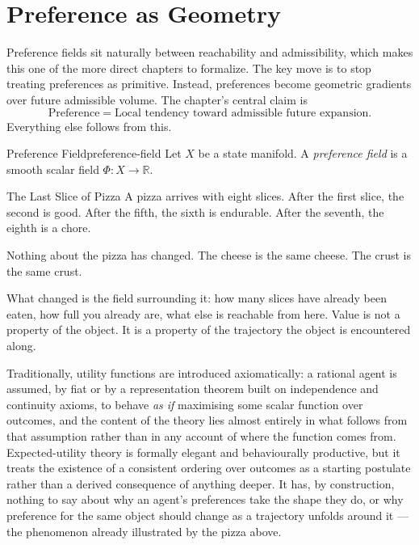 \documentclass[12pt,twoside,openright]{book}
\begin{document}
\section{Preference as Geometry}
\label{sec:ch22-geometry}

Preference fields sit naturally between reachability and
admissibility, which makes this one of the more direct
chapters to formalize. The key move is to stop treating
preferences as primitive. Instead, preferences become
geometric gradients over future admissible volume. The
chapter's central claim is
\[
  \text{Preference} =
  \text{Local tendency toward admissible future expansion}.
\]
Everything else follows from this.

\begin{definition}{Preference Field}{preference-field}
  Let $X$ be a state manifold. A \emph{preference field} is
  a smooth scalar field $\Phi : X \to \mathbb{R}$.
\end{definition}

\begin{distinctionaside}{The Last Slice of Pizza}
A pizza arrives with eight slices. After the first slice, the
second is good. After the fifth, the sixth is endurable.
After the seventh, the eighth is a chore.

Nothing about the pizza has changed. The cheese is the same
cheese. The crust is the same crust.

What changed is the field surrounding it: how many slices
have already been eaten, how full you already are, what else
is reachable from here. Value is not a property of the
object. It is a property of the trajectory the object is
encountered along.
\end{distinctionaside}

Traditionally, utility functions are introduced
axiomatically: a rational agent is assumed, by fiat or by a
representation theorem built on independence and continuity
axioms, to behave \emph{as if} maximising some scalar
function over outcomes, and the content of the theory lies
almost entirely in what follows from that assumption rather
than in any account of where the function comes from.
Expected-utility theory is formally elegant and behaviourally
productive, but it treats the existence of a consistent
ordering over outcomes as a starting postulate rather than a
derived consequence of anything deeper. It has, by
construction, nothing to say about why an agent's preferences
take the shape they do, or why preference for the same object
should change as a trajectory unfolds around it --- the
phenomenon already illustrated by the pizza above.
\end{document}
